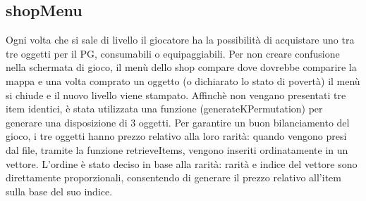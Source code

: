 \documentclass[10pt]{report}
\begin{document}
\subsection{shopMenu}

Ogni volta che si sale di livello il giocatore ha la possibilità di acquistare uno tra tre oggetti per 
il PG, consumabili o equipaggiabili. Per non creare confusione nella schermata di gioco, il menù dello shop compare dove dovrebbe comparire la mappa e una volta comprato un oggetto (o dichiarato lo stato di
povertà) il menù si chiude e il nuovo livello viene stampato. Affinchè non vengano presentati tre item
identici, è stata utilizzata una funzione (generateKPermutation) per generare una disposizione di 3
oggetti. Per garantire un buon bilanciamento del gioco, i tre oggetti hanno prezzo relativo alla loro
rarità: quando vengono presi dal file, tramite la funzione retrieveItems, vengono inseriti ordinatamente
in un vettore. L'ordine è stato deciso in base alla rarità: rarità e indice del vettore sono direttamente
proporzionali, consentendo di generare il prezzo relativo all'item sulla base del suo indice.
\end{document}
